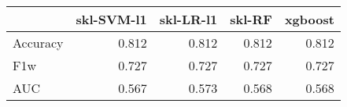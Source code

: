 \begin{tabular}{lrrrr}
\toprule
{} &  skl-SVM-l1 &  skl-LR-l1 &  skl-RF &  xgboost \\
\midrule
Accuracy &       0.812 &      0.812 &   0.812 &    0.812 \\
F1w      &       0.727 &      0.727 &   0.727 &    0.727 \\
AUC      &       0.567 &      0.573 &   0.568 &    0.568 \\
\bottomrule
\end{tabular}
